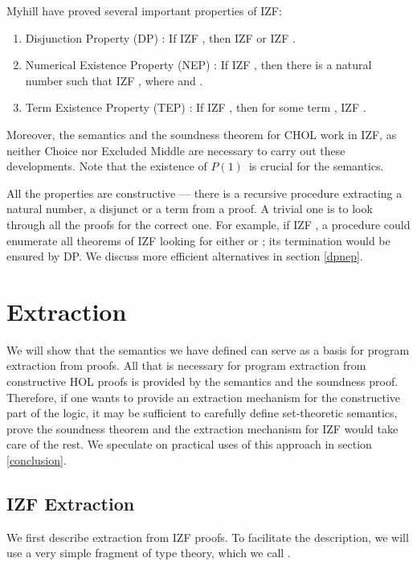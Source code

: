 \documentclass{LMCS}
\newcommand{\Prop}{\ensuremath{P(1)}}
\begin{document}
Myhill \cite{Myhill73} have proved several important properties of IZF:
\begin{enumerate}[]
\item Disjunction Property (DP) : If IZF , then IZF  or IZF .
\item Numerical Existence Property (NEP) : If IZF , then there is a natural number  such that IZF , where  and . 
\item Term Existence Property (TEP) : If IZF , then
for some term , IZF . 
\end{enumerate}

Moreover, the semantics and the soundness theorem for CHOL work in IZF, as
neither Choice nor Excluded Middle are necessary to carry out these
developments. Note that the existence of \Prop\ is crucial for the semantics. 

All the properties are constructive --- there is a
recursive procedure extracting a natural number, a disjunct or a term from a proof.
A trivial one is to look through all the proofs for the correct one. For
example, if IZF , a procedure could enumerate all theorems
of IZF looking for either  or ; its termination would be ensured by DP. 
We discuss more efficient alternatives in section \ref{dpnep}.

\section{Extraction}\label{extraction}

We will show that the semantics we have defined can serve as a basis for
program extraction from proofs. All that is necessary for program extraction
from constructive HOL proofs is provided by the semantics and the soundness
proof. Therefore, if one wants to provide an extraction mechanism for the
constructive part of the logic, it may be sufficient to carefully define set-theoretic semantics,
prove the soundness theorem and the extraction mechanism for IZF would take
care of the rest. We speculate on practical uses of this approach in section
\ref{conclusion}. 



\subsection{IZF Extraction}

We first describe extraction from IZF proofs. To facilitate the description,
we will use a very simple fragment of type theory, which we call . 
\end{document}
